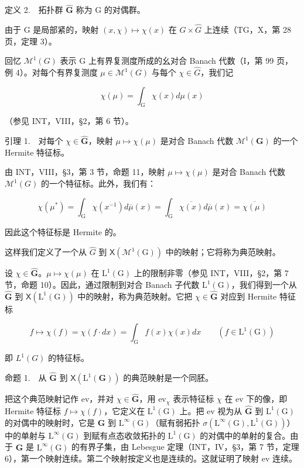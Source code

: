 定义 2.　拓扑群 \(\widehat{\mathbf{G}}\) 称为 G 的对偶群。

由于 G 是局部紧的，映射 \((x,\chi)\mapsto\chi(x)\) 在 \(G\times\widehat{G}\) 上连续（TG，X，第 28 页，定理 3）。

回忆 \(\mathcal{M}^{1}(G)\) 表示 G 上有界复测度所成的幺对合 Banach 代数（I，第 99 页，例 4）。对每个有界复测度 \(\mu\in\mathcal{M}^{1}(G)\) 与每个 \(\chi\in\widehat{G}\)，我们记

\[
\chi (\mu) = \int_ {\mathrm{G}} \chi (x) d \mu (x)\tag{1}
\]

（参见 INT，VIII，§2，第 6 节）。

引理 1.　对每个 \(\chi \in \widehat{\mathbf{G}}\)，映射 \(\mu \mapsto \chi(\mu)\) 是对合 Banach 代数 \(\mathcal{M}^1(\mathbf{G})\) 的一个 Hermite 特征标。

由 INT，VIII，§3，第 3 节，命题 11，映射 \(\mu \mapsto \chi(\mu)\) 是对合 Banach 代数 \(\mathcal{M}^{1}(G)\) 的一个特征标。此外，我们有：

\[
\chi (\mu^ {*}) = \int_ {\mathrm{G}} \chi (x ^ {- 1}) d \overline {{\mu}} (x) = \int_ {\mathrm{G}} \overline {{\chi (x)}} d \overline {{\mu}} (x) = \overline {{\chi (\mu)}}
\]

因此这个特征标是 Hermite 的。

这样我们定义了一个从 \(\widehat{G}\) 到 \(\mathsf{X}(\mathcal{M}^{1}(\mathrm{G}))\) 中的映射；它将称为典范映射。

设 \(\chi \in \widehat{\mathbf{G}}\)。\(\mu \mapsto \chi(\mu)\) 在 \(\mathrm{L}^1(\mathrm{G})\) 上的限制非零（参见 INT，VIII，§2，第 7 节，命题 10）。因此，通过限制到对合 Banach 子代数 \(\mathrm{L}^1(\mathrm{G})\)，我们得到一个从 \(\widehat{\mathbf{G}}\) 到 \(\mathsf{X}(\mathrm{L}^1(\mathrm{G}))\) 中的映射，称为典范映射。它把 \(\chi \in \widehat{\mathbf{G}}\) 对应到 Hermite 特征标

\[
f \mapsto \chi (f) = \chi (f \cdot d x) = \int_ {\mathrm{G}} f (x) \chi (x) d x \qquad (f \in \mathrm{L} ^ {1} (\mathrm{G}))\tag{2}
\]

即 \(L^{1}(G)\) 的特征标。

命题 1.　从 \(\widehat{\mathbf{G}}\) 到 \(\mathsf{X}(\mathrm{L}^{1}(\mathbf{G}))\) 的典范映射是一个同胚。

把这个典范映射记作 ev，并对 \(\chi \in \widehat{\mathbf{G}}\)，用 \(\mathrm{ev}_{\chi}\) 表示特征标 \(\chi\) 在 ev 下的像，即 Hermite 特征标 \(f \mapsto \chi(f)\)，它定义在 \(\mathrm{L}^1(\mathrm{G})\) 上。把 ev 视为从 \(\widehat{\mathbf{G}}\) 到 \(\mathrm{L}^1(\mathrm{G})\) 的对偶中的映射时，它是 \(\widehat{\mathbf{G}}\) 到 \(\mathrm{L}^{\infty}(\mathrm{G})\)（赋有弱拓扑 \(\sigma(\mathrm{L}^{\infty}(\mathrm{G}), \mathrm{L}^{1}(\mathrm{G}))\)）中的单射与 \(\mathrm{L}^{\infty}(\mathrm{G})\) 到赋有点态收敛拓扑的 \(\mathrm{L}^1(\mathrm{G})\) 的对偶中的单射的复合。由于 \(\widehat{\mathbf{G}}\) 是 \(\mathrm{L}^{\infty}(\mathrm{G})\) 的有界子集，由 Lebesgue 定理（INT，IV，§3，第 7 节，定理 6），第一个映射连续。第二个映射按定义也是连续的。这就证明了映射 ev 连续。

